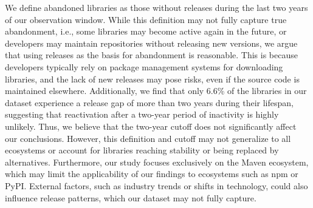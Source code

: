 
We define abandoned libraries as those without releases during the last two years of our observation window. While this definition may not fully capture true abandonment, i.e., some libraries may become active again in the future, or developers may maintain repositories without releasing new versions, we argue that using releases as the basis for abandonment is reasonable. This is because developers typically rely on package management systems for downloading libraries, and the lack of new releases may pose risks, even if the source code is maintained elsewhere. Additionally, we find that only 6.6\% of the libraries in our dataset experience a release gap of more than two years during their lifespan, suggesting that reactivation after a two-year period of inactivity is highly unlikely. Thus, we believe that the two-year cutoff does not significantly affect our conclusions. However, this definition and cutoff may not generalize to all ecosystems or account for libraries reaching stability or being replaced by alternatives. Furthermore, our study focuses exclusively on the Maven ecosystem, which may limit the applicability of our findings to ecosystems such as npm or PyPI. External factors, such as industry trends or shifts in technology, could also influence release patterns, which our dataset may not fully capture. 





